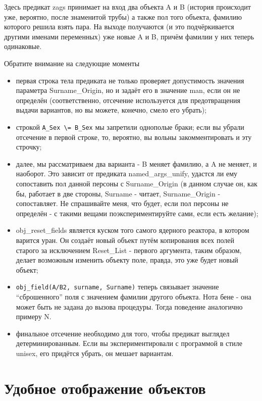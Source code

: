\documentclass[a4paper]{book}
\begin{document}
Здесь предикат zags принимает на вход два объекта A и B (история
происходит уже, вероятно, после знаменитой трубы) а также пол
того объекта, фамилию которого решила взять пара. На выходе
получаются (и это подчёркивается другими именами переменных) уже
новые A и B, причём фамилии у них теперь одинаковые.

Обратите внимание на следующие моменты

\begin{itemize}
\renewcommand{\labelitemi}{$\cdot$}
\item первая строка тела предиката не только проверяет
  допустимость значения параметра Surname\_Origin, но и задаёт
  его в значение man, если он не определён (соответственно,
  отсечение используется для предотвращения выдачи вариантов, но
  вы можете, конечно, смело его убрать);
\item строкой \verb|A_Sex \= B_Sex| мы запретили однополые браки;
  если вы убрали отсечение в первой строке, то, вероятно, вы
  вольны закомментировать и эту строчку;
\item далее, мы рассматриваем два варианта - B меняет фамилию, а
  A не меняет, и наоборот. Это зависит от предиката
  named\_args\_unify, удастся ли ему сопоставить пол данной
  персоны с Surname\_Origin (в данном случае он, как бы, работает
  в две стороны, Surname - читает, Surname\_Origin -
  сопоставляет. Не спрашивайте меня, что будет, если пол персоны
  не определён - с такими вещами поэкспериментируйте сами, если
  есть желание);
\item obj\_reset\_fields является куском того самого ядерного
  реактора, в котором варится уран. Он создаёт новый объект путём
  копирования всех полей старого за исключением Reset\_List -
  первого аргумента, таким образом, делает возможным изменить
  объекту поле, правда, это уже будет новый объект;
\item \verb|obj_field(A/B2, surname, Surname)| теперь связывает
  значение ``сброшенного'' поля с значением фамилии другого
  объекта. Нота бене - она может быть не задана до вызова
  процедуры. Тогда поведение аналогично примеру N.
\item финальное отсечение необходимо для того, чтобы предикат
  выглядел детерминированным. Если вы экспериментировали с
  программой в стиле unisex, его придётся убрать, он мешает
  вариантам.
\end{itemize}

\section{Удобное отображение объектов}
\end{document}
